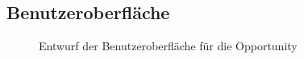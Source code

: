 \subsection{Benutzeroberfläche}
\label{app:Benutzeroberflaeche}
\begin{figure}[htb]
    \centering
    \caption{Entwurf der Benutzeroberfläche für die Opportunity}
    \end{figure}
    

  \clearpage 